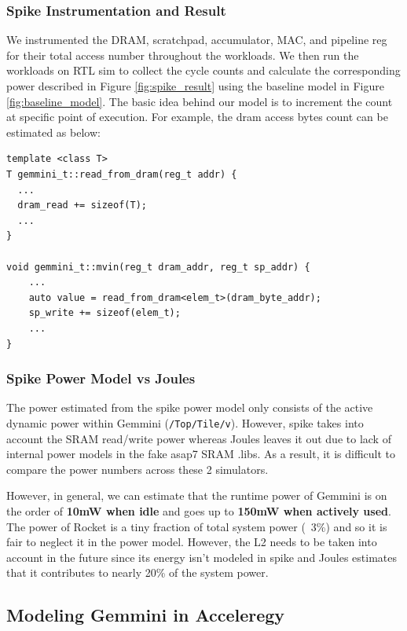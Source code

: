 \documentclass[sigconf]{acmart}
\begin{document}
\subsubsection{Spike Instrumentation and Result}
We instrumented the DRAM, scratchpad, accumulator, MAC, and pipeline reg for their total access number throughout the workloads. We then run the workloads on RTL sim to collect the cycle counts and calculate the corresponding power described in Figure \ref{fig:spike_result} using the baseline model in Figure \ref{fig:baseline_model}. The basic idea behind our model is to increment the count at specific point of execution. For example, the dram access bytes count can be estimated as below:
\begin{verbatim}
template <class T>
T gemmini_t::read_from_dram(reg_t addr) {
  ...
  dram_read += sizeof(T);
  ...
}

void gemmini_t::mvin(reg_t dram_addr, reg_t sp_addr) {
    ...
    auto value = read_from_dram<elem_t>(dram_byte_addr);
    sp_write += sizeof(elem_t);
    ...
}
\end{verbatim}

\subsubsection{Spike Power Model vs Joules}
The power estimated from the spike power model only consists of the active dynamic power within Gemmini (\texttt{/Top/Tile/v}).
However, spike takes into account the SRAM read/write power whereas Joules leaves it out due to lack of internal power models in the fake asap7 SRAM .libs.
As a result, it is difficult to compare the power numbers across these 2 simulators.

However, in general, we can estimate that the runtime power of Gemmini is on the order of \textbf{10mW when idle} and goes up to \textbf{150mW when actively used}.
The power of Rocket is a tiny fraction of total system power (~3\%) and so it is fair to neglect it in the power model.
However, the L2 needs to be taken into account in the future since its energy isn't modeled in spike and Joules estimates that it contributes to nearly 20\% of the system power.

\subsection{Modeling Gemmini in Acceleregy}
\end{document}
